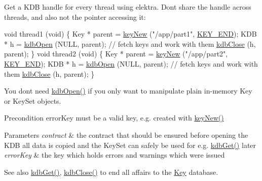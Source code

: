 Get a {\ttfamily K\+DB} handle for every thread using elektra. Don\textquotesingle{}t share the handle across threads, and also not the pointer accessing it\+:


\begin{DoxyCodeInclude}
\textcolor{keywordtype}{void} thread1 (\textcolor{keywordtype}{void})
\{
        Key * parent = \hyperlink{group__key_gad23c65b44bf48d773759e1f9a4d43b89}{keyNew} (\textcolor{stringliteral}{"/app/part1"}, \hyperlink{group__key_gga9b703ca49f48b482def322b77d3e6bc8aa8adb6fcb92dec58fb19410eacfdd403}{KEY\_END});
        KDB * h = \hyperlink{group__kdb_ga844e1299a84c3fbf1d3a905c5c893ba5}{kdbOpen} (NULL, parent);
        \textcolor{comment}{// fetch keys and work with them}
        \hyperlink{group__kdb_gadb54dc9fda17ee07deb9444df745c96f}{kdbClose} (h, parent);
\}
\textcolor{keywordtype}{void} thread2 (\textcolor{keywordtype}{void})
\{
        Key * parent = \hyperlink{group__key_gad23c65b44bf48d773759e1f9a4d43b89}{keyNew} (\textcolor{stringliteral}{"/app/part2"}, \hyperlink{group__key_gga9b703ca49f48b482def322b77d3e6bc8aa8adb6fcb92dec58fb19410eacfdd403}{KEY\_END});
        KDB * h = \hyperlink{group__kdb_ga844e1299a84c3fbf1d3a905c5c893ba5}{kdbOpen} (NULL, parent);
        \textcolor{comment}{// fetch keys and work with them}
        \hyperlink{group__kdb_gadb54dc9fda17ee07deb9444df745c96f}{kdbClose} (h, parent);
\}
\end{DoxyCodeInclude}
 You don\textquotesingle{}t need \hyperlink{group__kdb_ga844e1299a84c3fbf1d3a905c5c893ba5}{kdb\+Open()} if you only want to manipulate plain in-\/memory Key or Key\+Set objects.

\begin{DoxyPrecond}{Precondition}
error\+Key must be a valid key, e.\+g. created with \hyperlink{group__key_gad23c65b44bf48d773759e1f9a4d43b89}{key\+New()}
\end{DoxyPrecond}

\begin{DoxyParams}{Parameters}
{\em contract} & the contract that should be ensured before opening the K\+DB all data is copied and the Key\+Set can safely be used for e.\+g. \hyperlink{group__kdb_ga28e385fd9cb7ccfe0b2f1ed2f62453a1}{kdb\+Get()} later \\
\hline
{\em error\+Key} & the key which holds errors and warnings which were issued \\
\hline
\end{DoxyParams}
\begin{DoxySeeAlso}{See also}
\hyperlink{group__kdb_ga28e385fd9cb7ccfe0b2f1ed2f62453a1}{kdb\+Get()}, \hyperlink{group__kdb_gadb54dc9fda17ee07deb9444df745c96f}{kdb\+Close()} to end all affairs to the \hyperlink{group__key}{Key} database. 
\end{DoxySeeAlso}

